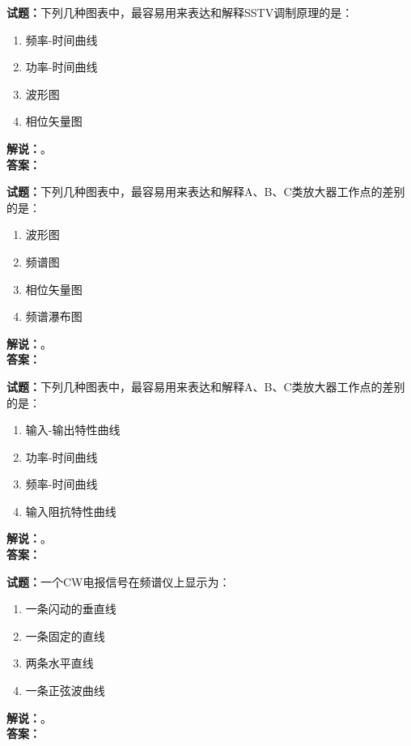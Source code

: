 \documentclass{ctexbook}
\begin{document}
\bigskip




\noindent\textbf{试题：}下列几种图表中，最容易用来表达和解释SSTV调制原理的是：
\begin{enumerate}[leftmargin=3em]
\item 频率-时间曲线
\item 功率-时间曲线
\item 波形图
\item 相位矢量图
\end{enumerate}
\noindent\textbf{解说：}\textbf{}。\\\noindent\textbf{答案：}

\bigskip




\noindent\textbf{试题：}下列几种图表中，最容易用来表达和解释A、B、C类放大器工作点的差别的是：
\begin{enumerate}[leftmargin=3em]
\item 波形图
\item 频谱图
\item 相位矢量图
\item 频谱瀑布图
\end{enumerate}
\noindent\textbf{解说：}\textbf{}。\\\noindent\textbf{答案：}

\bigskip




\noindent\textbf{试题：}下列几种图表中，最容易用来表达和解释A、B、C类放大器工作点的差别的是：
\begin{enumerate}[leftmargin=3em]
\item 输入-输出特性曲线
\item 功率-时间曲线
\item 频率-时间曲线
\item 输入阻抗特性曲线
\end{enumerate}
\noindent\textbf{解说：}\textbf{}。\\\noindent\textbf{答案：}

\bigskip




\noindent\textbf{试题：}一个CW电报信号在频谱仪上显示为：
\begin{enumerate}[leftmargin=3em]
\item 一条闪动的垂直线
\item 一条固定的直线
\item 两条水平直线
\item 一条正弦波曲线
\end{enumerate}
\noindent\textbf{解说：}\textbf{}。\\\noindent\textbf{答案：}
\end{document}
